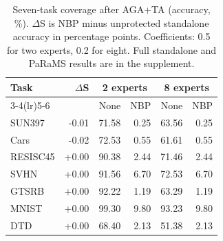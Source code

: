 \begin{table}[!t]
\centering
\small
\setlength{\tabcolsep}{3pt}
\caption{Seven-task coverage after AGA+TA (accuracy, \%). $\Delta$S is NBP minus unprotected standalone accuracy in percentage points. Coefficients: 0.5 for two experts, 0.2 for eight. Full standalone and PaRaMS results are in the supplement.}
\label{tab:coverage}
\begin{tabular}{lrrrrr}
\toprule
\multirow{2}{*}{Task} & \multirow{2}{*}{$\Delta$S} & \multicolumn{2}{c}{2 experts} & \multicolumn{2}{c}{8 experts} \\
\cmidrule(lr){3-4}\cmidrule(lr){5-6}
 & & None & NBP & None & NBP \\
\midrule
SUN397 & -0.01 & 71.58 & 0.25 & 63.56 & 0.25 \\
Cars & -0.02 & 72.53 & 0.55 & 61.61 & 0.55 \\
RESISC45 & +0.00 & 90.38 & 2.44 & 71.46 & 2.44 \\
SVHN & +0.00 & 91.56 & 6.70 & 72.53 & 6.70 \\
GTSRB & +0.00 & 92.22 & 1.19 & 63.29 & 1.19 \\
MNIST & +0.00 & 99.30 & 9.80 & 93.23 & 9.80 \\
DTD & +0.00 & 68.40 & 2.13 & 51.38 & 2.13 \\
\bottomrule
\end{tabular}
\end{table}
